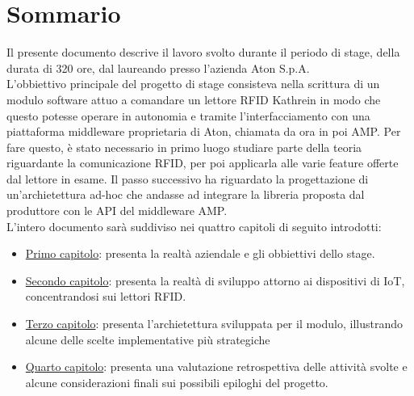 
\cleardoublepage
{}
{}
\begingroup
\let\clearpage\relax
\let\cleardoublepage\relax
\let\cleardoublepage\relax

\chapter*{Sommario}

Il presente documento descrive il lavoro svolto durante il periodo di stage, della durata di 320 ore, 
dal laureando \myName  presso l'azienda Aton S.p.A. \\
L'obbiettivo principale del progetto di stage consisteva nella scrittura di un modulo software 
attuo a comandare un lettore RFID Kathrein in modo che questo potesse operare in autonomia
e tramite l'interfacciamento con una piattaforma middleware proprietaria di Aton, chiamata da ora in poi AMP.
Per fare questo, è stato necessario in primo luogo studiare parte della teoria riguardante la comunicazione
RFID, per poi applicarla alle varie feature offerte dal lettore in esame.
Il passo successivo ha riguardato la progettazione di un'archietettura ad-hoc che andasse ad integrare
la libreria proposta dal produttore con le API del middleware AMP. \\
L'intero documento sarà suddiviso nei quattro capitoli di seguito introdotti:
\begin{itemize}
    \item \hyperref[cap:introduzione]{Primo capitolo}: presenta la realtà aziendale e gli obbiettivi dello stage.
    \item \hyperref[cap:lo-stage]{Secondo capitolo}: presenta la realtà di sviluppo attorno ai dispositivi di IoT, concentrandosi
        sui lettori RFID.
    \item \hyperref[cap:resoconto-progetto]{Terzo capitolo}: presenta l'archietettura sviluppata per il modulo, illustrando alcune delle
        scelte implementative più strategiche
    \item \hyperref[cap:conclusioni]{Quarto capitolo}: presenta una valutazione retrospettiva delle attività svolte 
        e alcune considerazioni finali sui possibili epiloghi del progetto.
\end{itemize}

%
%

\endgroup			

\vfill

